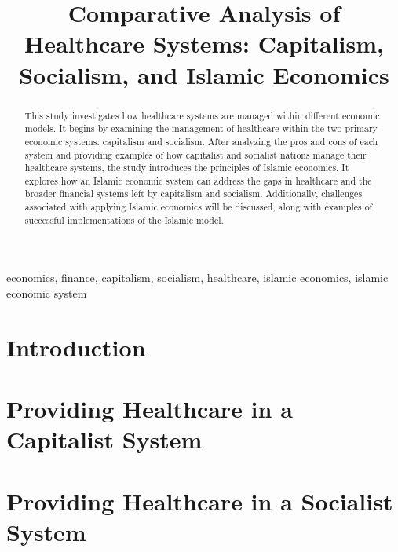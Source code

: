 \documentclass[conference]{IEEEtran}
\begin{document}
\title{Comparative Analysis of Healthcare Systems: Capitalism, Socialism, and Islamic Economics}

\author{
}

\maketitle

\begin{abstract}
This study investigates how healthcare systems are managed within different economic models. It begins by examining the management of healthcare within the two primary economic systems: capitalism and socialism. After analyzing the pros and cons of each system and providing examples of how capitalist and socialist nations manage their healthcare systems, the study introduces the principles of Islamic economics. It explores how an Islamic economic system can address the gaps in healthcare and the broader financial systems left by capitalism and socialism. Additionally, challenges associated with applying Islamic economics will be discussed, along with examples of successful implementations of the Islamic model. 
\end{abstract}

\begin{IEEEkeywords}
economics, finance, capitalism, socialism, healthcare, islamic economics,
islamic economic system
\end{IEEEkeywords}

\section{Introduction}


\section{Providing Healthcare in a Capitalist System}


\section{Providing Healthcare in a Socialist System}

\end{document}
